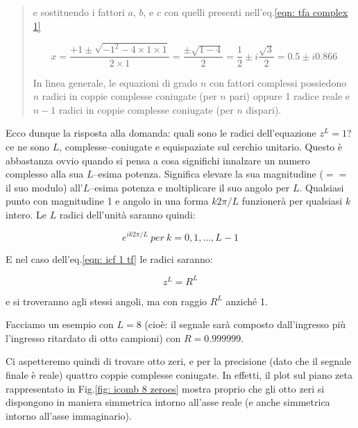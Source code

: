 \begin{quote}
e sostituendo i fattori $a$, $b$, e $c$ con quelli presenti nell'eq.\ref{eqn: tfa complex 1}

\begin{equation}\label{eqn: tfa complex 3}
				x = \frac{+1 \pm \sqrt{-1^{2} - 4 \times 1 \times 1}}{2 \times 1} = \frac{\pm \sqrt{1 - 4}}{2} = \frac{1}{2} \pm i \frac{\sqrt{3}}{2} = 0.5 \pm i 0.866
\end{equation}

In linea generale, le equazioni di grado $n$ con fattori complessi possiedono
$n$ radici in coppie complesse coniugate (per $n$ pari) oppure 1 radice reale
e $n - 1$ radici in coppie complesse coniugate (per $n$ dispari).
\end{quote}

Ecco dunque la risposta alla domanda: quali sono le radici dell'equazione $z^{L} = 1$?
ce ne sono $L$, complesse--coniugate e equispaziate sul cerchio
unitario. Questo \`e abbastanza ovvio quando si pensa a cosa significhi
innalzare un numero complesso alla sua $L$--esima potenza. Significa
elevare la sua magnitudine ($==$ il suo modulo) all'$L$--esima potenza e
moltiplicare il suo angolo per $L$. Qualsiasi punto con magnitudine 1 e
angolo in una forma $k 2 \pi / L$ funzioner\`a per qualsiasi $k$ intero.
Le $L$ radici dell'unit\`a saranno quindi:

\begin{equation}\label{eqn: roots of unity}
		e^{i k 2 \pi / L}~per~k = 0, 1, \dots, L - 1
\end{equation}

E nel caso dell'eq.\ref{eqn: icf 1 tf} le radici saranno:

\begin{equation}\label{eqn: roots of R}
		z^{L} = R^{L}
\end{equation}

e si troveranno agli stessi angoli, ma con raggio $R^{L}$ anzich\'e 1.

Facciamo un esempio con $L = 8$ (cio\`e: il segnale sar\`a composto
dall'ingresso pi\`u l'ingresso ritardato di otto campioni) con $R = 0.999999$.

Ci aspetteremo quindi di trovare otto zeri, e per la precisione (dato che il
segnale finale \`e reale) quattro coppie complesse coniugate.
In effetti, il plot sul piano zeta rappresentato in Fig.\vref{fig: icomb 8 zeroes}
mostra proprio che gli otto zeri si dispongono in maniera simmetrica intorno
all'asse reale (e anche simmetrica intorno all'asse immaginario).

